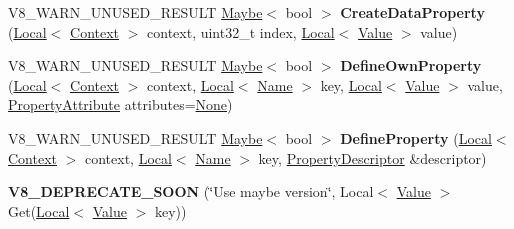 \begin{DoxyCompactItemize}
\item 
\mbox{\label{classv8_1_1Object_aec3a99813837c0bc6444c59f8e5ca22a}} 
V8\+\_\+\+W\+A\+R\+N\+\_\+\+U\+N\+U\+S\+E\+D\+\_\+\+R\+E\+S\+U\+LT \mbox{\hyperlink{classv8_1_1Maybe}{Maybe}}$<$ bool $>$ {\bfseries Create\+Data\+Property} (\mbox{\hyperlink{classv8_1_1Local}{Local}}$<$ \mbox{\hyperlink{classv8_1_1Context}{Context}} $>$ context, uint32\+\_\+t index, \mbox{\hyperlink{classv8_1_1Local}{Local}}$<$ \mbox{\hyperlink{classv8_1_1Value}{Value}} $>$ value)
\item 
\mbox{\label{classv8_1_1Object_a65f44f92b7ee9d479ce6b3ebb9ac8d4b}} 
V8\+\_\+\+W\+A\+R\+N\+\_\+\+U\+N\+U\+S\+E\+D\+\_\+\+R\+E\+S\+U\+LT \mbox{\hyperlink{classv8_1_1Maybe}{Maybe}}$<$ bool $>$ {\bfseries Define\+Own\+Property} (\mbox{\hyperlink{classv8_1_1Local}{Local}}$<$ \mbox{\hyperlink{classv8_1_1Context}{Context}} $>$ context, \mbox{\hyperlink{classv8_1_1Local}{Local}}$<$ \mbox{\hyperlink{classv8_1_1Name}{Name}} $>$ key, \mbox{\hyperlink{classv8_1_1Local}{Local}}$<$ \mbox{\hyperlink{classv8_1_1Value}{Value}} $>$ value, \mbox{\hyperlink{namespacev8_a05f25f935e108a1ea2d150e274602b87}{Property\+Attribute}} attributes=\mbox{\hyperlink{namespacev8_a05f25f935e108a1ea2d150e274602b87a7ab4d58719c33b3ea2dfaefa29b111df}{None}})
\item 
\mbox{\label{classv8_1_1Object_a45a9be0638554ca4f6049b7cf094fcd4}} 
V8\+\_\+\+W\+A\+R\+N\+\_\+\+U\+N\+U\+S\+E\+D\+\_\+\+R\+E\+S\+U\+LT \mbox{\hyperlink{classv8_1_1Maybe}{Maybe}}$<$ bool $>$ {\bfseries Define\+Property} (\mbox{\hyperlink{classv8_1_1Local}{Local}}$<$ \mbox{\hyperlink{classv8_1_1Context}{Context}} $>$ context, \mbox{\hyperlink{classv8_1_1Local}{Local}}$<$ \mbox{\hyperlink{classv8_1_1Name}{Name}} $>$ key, \mbox{\hyperlink{classv8_1_1PropertyDescriptor}{Property\+Descriptor}} \&descriptor)
\item 
\mbox{\label{classv8_1_1Object_a15c40cda73a1927bef406b85032d5564}} 
{\bfseries V8\+\_\+\+D\+E\+P\+R\+E\+C\+A\+T\+E\+\_\+\+S\+O\+ON} (\char`\"{}Use maybe version\char`\"{}, Local$<$ \mbox{\hyperlink{classv8_1_1Value}{Value}} $>$ Get(\mbox{\hyperlink{classv8_1_1Local}{Local}}$<$ \mbox{\hyperlink{classv8_1_1Value}{Value}} $>$ key))
\item 
\mbox{\label{classv8_1_1Object_a239c03bb250cd6bf583ca60f72e18918}} 

\end{DoxyCompactItemize}
